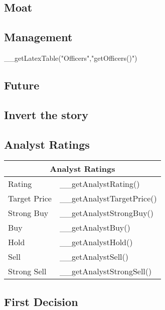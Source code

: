 \subsection{Moat}

\subsection{Management}

__getLatexTable("Officers","getOfficers()")

\subsection{Future}

\subsection{Invert the story}

\subsection{Analyst Ratings}

\begin{tabularx}{\textwidth}{|X|X|}
 \hline
 \multicolumn{2}{|c|}{Analyst Ratings} \\
 \hline
 Rating       & __getAnalystRating() \\
 Target Price & __getAnalystTargetPrice() \\
 Strong Buy   & __getAnalystStrongBuy() \\
 Buy          & __getAnalystBuy() \\
 Hold         & __getAnalystHold() \\
 Sell         & __getAnalystSell() \\
 Strong Sell  & __getAnalystStrongSell() \\
 \hline
\end{tabularx}

\subsection{First Decision}